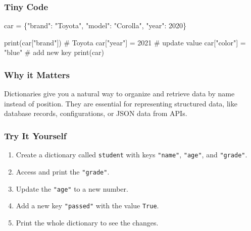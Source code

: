 \documentclass[
  letterpaper,
  DIV=11,
  numbers=noendperiod]{scrreprt}
\newenvironment{Shaded}{\begin{snugshade}}{\end{snugshade}}
\newcommand{\BuiltInTok}[1]{\textcolor[rgb]{0.00,0.23,0.31}{#1}}
\newcommand{\CommentTok}[1]{\textcolor[rgb]{0.37,0.37,0.37}{#1}}
\newcommand{\DecValTok}[1]{\textcolor[rgb]{0.68,0.00,0.00}{#1}}
\newcommand{\NormalTok}[1]{\textcolor[rgb]{0.00,0.23,0.31}{#1}}
\newcommand{\OperatorTok}[1]{\textcolor[rgb]{0.37,0.37,0.37}{#1}}
\newcommand{\StringTok}[1]{\textcolor[rgb]{0.13,0.47,0.30}{#1}}
\providecommand{\tightlist}{%
  \setlength{\itemsep}{0pt}\setlength{\parskip}{0pt}}
\begin{document}
\subsubsection{Tiny Code}\label{tiny-code-27}

\begin{Shaded}
\begin{Highlighting}[]
\NormalTok{car }\OperatorTok{=}\NormalTok{ \{}\StringTok{"brand"}\NormalTok{: }\StringTok{"Toyota"}\NormalTok{, }\StringTok{"model"}\NormalTok{: }\StringTok{"Corolla"}\NormalTok{, }\StringTok{"year"}\NormalTok{: }\DecValTok{2020}\NormalTok{\}}

\BuiltInTok{print}\NormalTok{(car[}\StringTok{"brand"}\NormalTok{])      }\CommentTok{\# Toyota}
\NormalTok{car[}\StringTok{"year"}\NormalTok{] }\OperatorTok{=} \DecValTok{2021}       \CommentTok{\# update value}
\NormalTok{car[}\StringTok{"color"}\NormalTok{] }\OperatorTok{=} \StringTok{"blue"}    \CommentTok{\# add new key}
\BuiltInTok{print}\NormalTok{(car)}
\end{Highlighting}
\end{Shaded}

\subsubsection{Why it Matters}\label{why-it-matters-27}

Dictionaries give you a natural way to organize and retrieve data by
name instead of position. They are essential for representing structured
data, like database records, configurations, or JSON data from APIs.

\subsubsection{Try It Yourself}\label{try-it-yourself-27}

\begin{enumerate}
\def\labelenumi{\arabic{enumi}.}
\tightlist
\item
  Create a dictionary called \texttt{student} with keys \texttt{"name"},
  \texttt{"age"}, and \texttt{"grade"}.
\item
  Access and print the \texttt{"grade"}.
\item
  Update the \texttt{"age"} to a new number.
\item
  Add a new key \texttt{"passed"} with the value \texttt{True}.
\item
  Print the whole dictionary to see the changes.
\end{enumerate}
\end{document}
